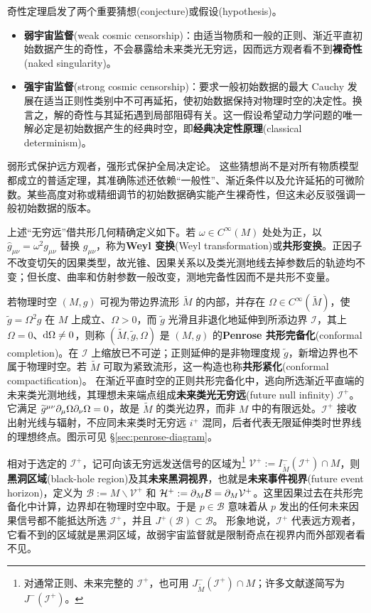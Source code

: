 奇性定理启发了两个重要猜想(conjecture)或假设(hypothesis)。
\begin{itemize}
    \item \textbf{弱宇宙监督}(weak cosmic censorship)：由适当物质和一般的正则、渐近平直初始数据产生的奇性，不会暴露给未来类光无穷远，因而远方观者看不到\textbf{裸奇性}(naked singularity)。
    \item \textbf{强宇宙监督}(strong cosmic censorship)：要求一般初始数据的最大 Cauchy 发展在适当正则性类别中不可再延拓，使初始数据保持对物理时空的决定性。换言之，解的奇性与其延拓遇到局部阻碍有关。这一假设希望动力学问题的唯一解必定是初始数据产生的经典时空，即\textbf{经典决定性原理}(classical determinism)。
\end{itemize}
弱形式保护远方观者，强形式保护全局决定论。
这些猜想尚不是对所有物质模型都成立的普适定理，其准确陈述还依赖“一般性”、渐近条件以及允许延拓的可微阶数。某些高度对称或精细调节的初始数据确实能产生裸奇性，但这未必反驳强调一般初始数据的版本。

上述“无穷远”借共形几何精确定义如下。若 $\omega\in C^\infty(M)$ 处处为正，以 $\widehat g_{\mu\nu}=\omega^2g_{\mu\nu}$ 替换 $g_{\mu\nu}$，称为\textbf{Weyl 变换}(Weyl transformation)或\textbf{共形变换}。正因子不改变切矢的因果类型，故光锥、因果关系以及类光测地线去掉参数后的轨迹均不变；但长度、曲率和仿射参数一般改变，测地完备性因而不是共形不变量。

若物理时空 $(M,g)$ 可视为带边界流形 $\widetilde M$ 的内部，并存在 $\Omega\in C^\infty(\widetilde M)$，使 $\widetilde g=\Omega^2g$ 在 $M$ 上成立、$\Omega>0$，而 $\widetilde g$ 光滑且非退化地延伸到所添边界 $\mathscr I$，其上 $\Omega=0$、$\dd\Omega\ne0$，则称 $(\widetilde M,\widetilde g,\Omega)$ 是 $(M,g)$ 的\textbf{Penrose 共形完备化}(conformal completion)。在 $\mathscr I$ 上缩放已不可逆；正则延伸的是非物理度规 $\widetilde g$，新增边界也不属于物理时空。若 $\widetilde M$ 可取为紧致流形，这一构造也称\textbf{共形紧化}(conformal compactification)。
在渐近平直时空的正则共形完备化中，逃向所选渐近平直端的未来类光测地线，其理想未来端点组成\textbf{未来类光无穷远}(future null infinity) $\mathscr I^+$。它满足 $\widetilde g^{\mu\nu}\partial_\mu\Omega\partial_\nu\Omega=0$，故是 $\widetilde M$ 的类光边界，而非 $M$ 中的有限远处。$\mathscr I^+$ 接收出射光线与辐射，不应同未来类时无穷远 $i^+$ 混同，后者代表无限延伸类时世界线的理想终点。图示可见 \S\ref{sec:penrose-diagram}。

相对于选定的 $\mathscr I^+$，记可向该无穷远发送信号的区域为\footnote{对通常正则、未来完整的 $\mathscr I^+$，也可用 $J^-_{\widetilde M}(\mathscr I^+)\cap M$；许多文献遂简写为 $J^-(\mathscr I^+)$。} $\mathcal V^+:=I^-_{\widetilde M}(\mathscr I^+)\cap M$，则\textbf{黑洞区域}(black-hole region)及其\textbf{未来黑洞视界}，也就是\textbf{未来事件视界}(future event horizon)，定义为 $\mathcal B:=M\backslash\mathcal V^+$ 和 $\mathcal H^+:=\partial_M\mathcal B=\partial_M\mathcal V^+$。这里因果过去在共形完备化中计算，边界却在物理时空中取。于是 $p\in\mathcal B$ 意味着从 $p$ 发出的任何未来因果信号都不能抵达所选 $\mathscr I^+$，并且 $J^+(\mathcal B)\subset\mathcal B$。
形象地说，$\mathscr I^+$ 代表远方观者，它看不到的区域就是黑洞区域，故弱宇宙监督就是限制奇点在视界内而外部观者看不见。


